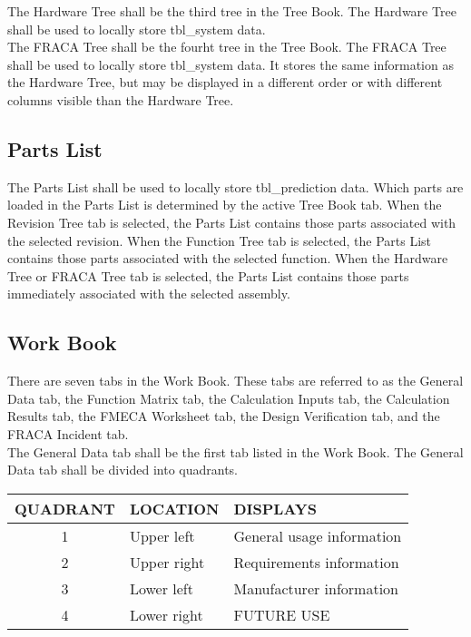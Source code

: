 \documentclass[11pt, 12pt, twoside, onecolumn]{article}
\begin{document}
\noindent The Hardware Tree shall be the third tree in the Tree Book.  The Hardware Tree shall be used to locally store tbl\_system data. \\

\noindent The FRACA Tree shall be the fourht tree in the Tree Book.  The FRACA Tree shall be used to locally store tbl\_system data.  It stores the same information as the Hardware Tree, but may be displayed in a different order or with different columns visible than the Hardware Tree. \\

\subsection{\bf \large Parts List}

\noindent The Parts List shall be used to locally store tbl\_prediction data.  Which parts are loaded in the Parts List is determined by the active Tree Book tab.  When the Revision Tree tab is selected, the Parts List contains those parts associated with the selected revision.  When the Function Tree tab is selected, the Parts List contains those parts associated with the selected function.  When the Hardware Tree or FRACA Tree tab is selected, the Parts List contains those parts immediately associated with the selected assembly. \\

\subsection{\bf \large Work Book}

\noindent There are seven tabs in the Work Book.  These tabs are referred to as the General Data tab, the Function Matrix tab, the Calculation Inputs tab, the Calculation Results tab, the FMECA Worksheet tab, the Design Verification tab, and the FRACA Incident tab. \\

\noindent The General Data tab shall be the first tab listed in the Work Book.  The General Data tab shall be divided into quadrants. \\

    \begin{longtable}{cll}
    QUADRANT & LOCATION & DISPLAYS \\
    \hline
    1 & Upper left & General usage information \\
    2 & Upper right & Requirements information \\
    3 & Lower left & Manufacturer information \\
    4 & Lower right & FUTURE USE \\
    \hline
    \end{longtable}
\end{document}
